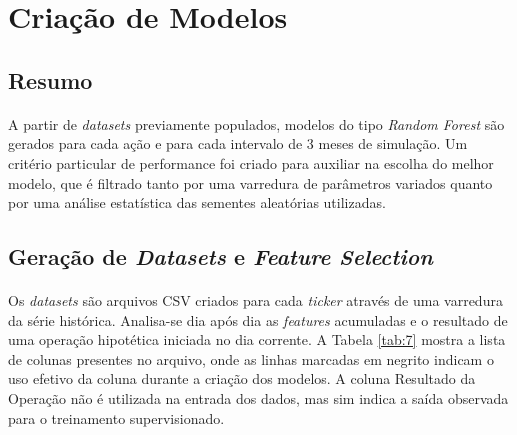\section{Criação de Modelos}

\subsection{Resumo}

\paragraph{} A partir de \textit{datasets} previamente populados, modelos do tipo \textit{Random Forest} são gerados para cada ação e para cada intervalo de 3 meses de simulação. Um critério particular de performance foi criado para auxiliar na escolha do melhor modelo, que é filtrado tanto por uma varredura de parâmetros variados quanto por uma análise estatística das sementes aleatórias utilizadas.


\subsection{Geração de \textit{Datasets} e \textit{Feature Selection}}

\paragraph{} Os \textit{datasets} são arquivos CSV criados para cada \textit{ticker} através de uma varredura da série histórica. Analisa-se dia após dia as \textit{features} acumuladas e o resultado de uma operação hipotética iniciada no dia corrente. A Tabela \ref{tab:7} mostra a lista de colunas presentes no arquivo, onde as linhas marcadas em negrito indicam o uso efetivo da coluna durante a criação dos modelos. A coluna Resultado da Operação não é utilizada na entrada dos dados, mas sim indica a saída observada para o treinamento supervisionado.

